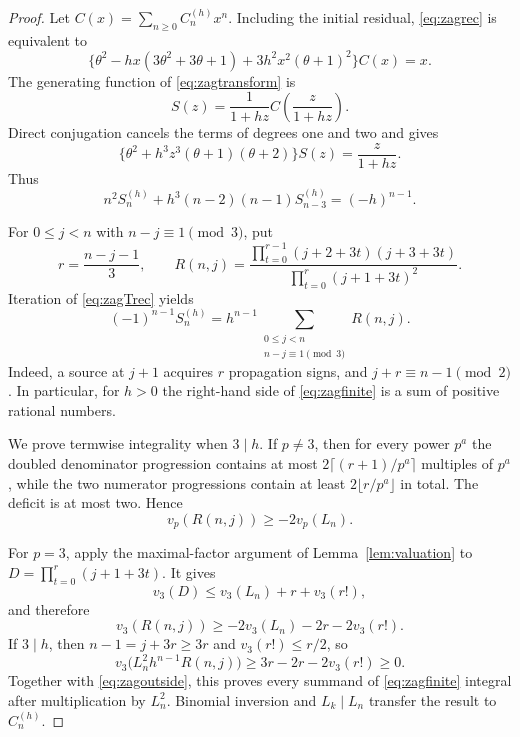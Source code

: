 \documentclass[11pt]{article}
\theoremstyle{remark}
\begin{document}
\begin{proof}
Let $C(x)=\sum_{n\ge0}C^{(h)}_nx^n$.  Including the initial residual,
\eqref{eq:zagrec} is equivalent to
\[
 \{\theta^2-hx(3\theta^2+3\theta+1)
        +3h^2x^2(\theta+1)^2\}C(x)=x.
\]
The generating function of \eqref{eq:zagtransform} is
\[
 S(z)=\frac1{1+hz}C\!\left(\frac{z}{1+hz}\right).
\]
Direct conjugation cancels the terms of degrees one and two and gives
\begin{equation}\label{eq:zagoperator}
 \{\theta^2+h^3z^3(\theta+1)(\theta+2)\}S(z)
 =\frac{z}{1+hz}.
\end{equation}
Thus
\begin{equation}\label{eq:zagTrec}
 n^2S^{(h)}_n+h^3(n-2)(n-1)S^{(h)}_{n-3}=(-h)^{n-1}.
\end{equation}

For $0\le j<n$ with $n-j\equiv1\pmod3$, put
\[
 r=\frac{n-j-1}{3},\qquad
 R(n,j)=
 \frac{\prod_{t=0}^{r-1}(j+2+3t)(j+3+3t)}
      {\prod_{t=0}^{r}(j+1+3t)^2}.
\]
Iteration of \eqref{eq:zagTrec} yields
\begin{equation}\label{eq:zagfinite}
 (-1)^{n-1}S^{(h)}_n
 =h^{n-1}\!
 \sum_{\substack{0\le j<n\\n-j\equiv1\pmod3}}R(n,j).
\end{equation}
Indeed, a source at $j+1$ acquires $r$ propagation signs, and
$j+r\equiv n-1\pmod2$.  In particular, for $h>0$ the right-hand side of
\eqref{eq:zagfinite} is a sum of positive rational numbers.

We prove termwise integrality when $3\mid h$.  If $p\ne3$, then for every
power $p^a$ the doubled denominator progression contains at most
$2\lceil(r+1)/p^a\rceil$ multiples of $p^a$, while the two numerator
progressions contain at least $2\lfloor r/p^a\rfloor$ in total.  The deficit
is at most two.  Hence
\begin{equation}\label{eq:zagoutside}
 v_p(R(n,j))\ge-2v_p(L_n).
\end{equation}

For $p=3$, apply the maximal-factor argument of
Lemma~\ref{lem:valuation} to
$D=\prod_{t=0}^r(j+1+3t)$.  It gives
\[
 v_3(D)\le v_3(L_n)+r+v_3(r!),
\]
and therefore
\begin{equation}\label{eq:zaginside}
 v_3(R(n,j))\ge-2v_3(L_n)-2r-2v_3(r!).
\end{equation}
If $3\mid h$, then $n-1=j+3r\ge3r$ and
$v_3(r!)\le r/2$, so
\[
 v_3\bigl(L_n^2h^{n-1}R(n,j)\bigr)
 \ge3r-2r-2v_3(r!)\ge0.
\]
Together with \eqref{eq:zagoutside}, this proves every summand of
\eqref{eq:zagfinite} integral after multiplication by $L_n^2$.  Binomial
inversion and $L_k\mid L_n$ transfer the result to $C^{(h)}_n$.


\end{proof}
\end{document}
